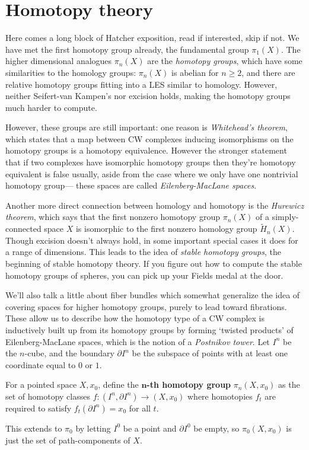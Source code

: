 \section{Homotopy theory} 
Here comes a long block of Hatcher exposition, read if interested, skip if not.
\orbreak
We have met the first homotopy group already, the fundamental group $\pi_1(X)$. The higher dimensional analogues $\pi_n (X)$ are the \emph{homotopy groups}, which have some similarities to the homology groups: $\pi_n (X)$ is abelian for $n\geq 2$, and there are relative homotopy groups fitting into a LES similar to homology. However, neither Seifert-van Kampen's nor excision holds, making the homotopy groups much harder to compute. 

However, these groups are still important: one reason is \emph{Whitehead's theorem}, which states that a map between CW complexes inducing isomorphisms on the homotopy groups is a homotopy equivalence. However the stronger statement that if two complexes have isomorphic homotopy groups then they're homotopy equivalent is false usually, aside from the case where we only have one nontrivial homotopy group— these spaces are called \emph{Eilenberg-MacLane spaces}.

Another more direct connection between homology and homotopy is the \emph{Hurewicz theorem}, which says that the first nonzero homotopy group $\pi_n (X)$ of a simply-connected space $X$ is isomorphic to the first nonzero homology group $\widetilde H_n (X)$. Though excision doesn't always hold, in some important special cases it does for a range of dimensions. This leads to the idea of \emph{stable homotopy groups}, the beginning of stable homotopy theory. If you figure out how to compute the stable homotopy groups of spheres, you can pick up your Fields medal at the door.

We'll also talk a little about fiber bundles which somewhat generalize the idea of covering spaces for higher homotopy groups, purely to lead toward fibrations. These allow us to describe how the homotopy type of a CW complex is inductively built up from its homotopy groups by forming `twisted products' of Eilenberg-MacLane spaces, which is the notion of a \emph{Postnikov tower}.
\orbreak
Let $I^n $ be the $n$-cube, and the boundary $\partial I^n $ be the subspace of points with at least one coordinate equal to $0$ or $1$. 
\begin{definition}
    For a pointed space $X,x_0$, define the $\mathbf n$\textbf{-th homotopy group} $\pi_n (X,x_0)$ as the set of homotopy classes $f \colon (I^n ,\partial I^n ) \to (X,x_0)$ where homotopies $f_t$ are required to satisfy $f_t(\partial I^n )=x_0$ for all $t$. 
\end{definition}
This extends to $\pi_0$ by letting $I^0$ be a point and $\partial I^0$ be empty, so $\pi_0(X,x_0)$ is just the set of path-components of $X$.

